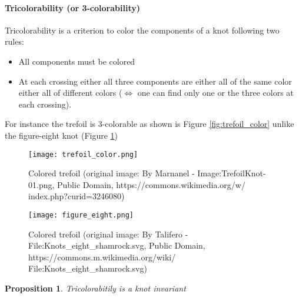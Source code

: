 \documentclass[12pt, a4paper]{article}
\newtheorem{proposition}{Proposition}
\begin{document}
\paragraph{Tricolorability (or 3-colorability)}

Tricolorability is a criterion to color the components of a knot following two rules:

\begin{itemize}
  \item All components must be colored
  \item At each crossing either all three components are either all of the same color either all of different colors ($\Longleftrightarrow$ one can find only one or the three colors at each crossing). 
\end{itemize}

For instance the trefoil is 3-colorable as shown is Figure \ref{fig:trefoil_color} unlike the figure-eight knot (Figure \ref{fig:figure8})\\


\begin{figure}[H]
  \begin{minipage}[c]{.4\textwidth}
    \centering
    \texttt{[image: trefoil\_color.png]}
    \caption{Colored trefoil (original image: By Marnanel - Image:TrefoilKnot-01.png, Public Domain, https://commons.wikimedia.org/w/ index.php?curid=3246080)}
    \label{fig:trefoil_color}
  \end{minipage}
  \hfill
  \begin{minipage}[c]{.4\textwidth}
    \centering
    \texttt{[image: figure\_eight.png]}
    \caption{Colored trefoil (original image: By Talifero - File:Knots\_eight\_shamrock.svg, Public Domain, https://commons.m.wikimedia.org/wiki/ File:Knots\_eight\_shamrock.svg)}
    \label{fig:figure8}
  \end{minipage}  
\end{figure}

\begin{proposition}
  Tricolorabitily is a knot invariant
\end{proposition}
\end{document}
